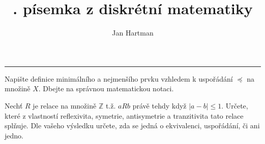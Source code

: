 \documentclass[10pt]{article}
\title{\tutnum. písemka z diskrétní matematiky}
\author{Jan Hartman}
\newcommand{\titlerule}{%
    \noindent %
    \makebox[\textwidth]{\large \thetitle \hfill Jméno: \hspace{4cm}}
    \rule{\textwidth}{0.4pt}%
}
\begin{document}
\titlerule

\begin{problem}[4 body]
Napište definice minimálního a nejmenšího prvku vzhledem k uspořádání $\preceq$ na množině $X$. Dbejte na správnou matematickou notaci.

\end{problem}

\begin{problem}[6 bodů]
Nechť $R$ je relace na množině $\mathbb{Z}$ t.ž. $aRb$ právě tehdy když $|a-b| \leq 1$. Určete, které z vlastností reflexivita, symetrie, antisymetrie a tranzitivita tato relace splňuje. Dle vašeho výsledku určete, zda se jedná o ekvivalenci, uspořádání, či ani jedno.
\end{problem}
\end{document}
